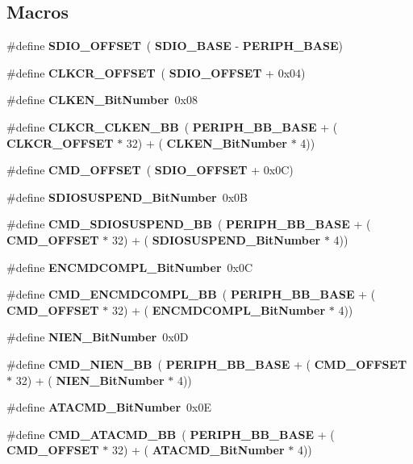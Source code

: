 \subsection*{Macros}
\begin{DoxyCompactItemize}
\item 
\#define \textbf{ S\+D\+I\+O\+\_\+\+O\+F\+F\+S\+ET}~(\textbf{ S\+D\+I\+O\+\_\+\+B\+A\+SE} -\/ \textbf{ P\+E\+R\+I\+P\+H\+\_\+\+B\+A\+SE})
\item 
\#define \textbf{ C\+L\+K\+C\+R\+\_\+\+O\+F\+F\+S\+ET}~(\textbf{ S\+D\+I\+O\+\_\+\+O\+F\+F\+S\+ET} + 0x04)
\item 
\#define \textbf{ C\+L\+K\+E\+N\+\_\+\+Bit\+Number}~0x08
\item 
\#define \textbf{ C\+L\+K\+C\+R\+\_\+\+C\+L\+K\+E\+N\+\_\+\+BB}~(\textbf{ P\+E\+R\+I\+P\+H\+\_\+\+B\+B\+\_\+\+B\+A\+SE} + (\textbf{ C\+L\+K\+C\+R\+\_\+\+O\+F\+F\+S\+ET} $\ast$ 32) + (\textbf{ C\+L\+K\+E\+N\+\_\+\+Bit\+Number} $\ast$ 4))
\item 
\#define \textbf{ C\+M\+D\+\_\+\+O\+F\+F\+S\+ET}~(\textbf{ S\+D\+I\+O\+\_\+\+O\+F\+F\+S\+ET} + 0x0\+C)
\item 
\#define \textbf{ S\+D\+I\+O\+S\+U\+S\+P\+E\+N\+D\+\_\+\+Bit\+Number}~0x0B
\item 
\#define \textbf{ C\+M\+D\+\_\+\+S\+D\+I\+O\+S\+U\+S\+P\+E\+N\+D\+\_\+\+BB}~(\textbf{ P\+E\+R\+I\+P\+H\+\_\+\+B\+B\+\_\+\+B\+A\+SE} + (\textbf{ C\+M\+D\+\_\+\+O\+F\+F\+S\+ET} $\ast$ 32) + (\textbf{ S\+D\+I\+O\+S\+U\+S\+P\+E\+N\+D\+\_\+\+Bit\+Number} $\ast$ 4))
\item 
\#define \textbf{ E\+N\+C\+M\+D\+C\+O\+M\+P\+L\+\_\+\+Bit\+Number}~0x0C
\item 
\#define \textbf{ C\+M\+D\+\_\+\+E\+N\+C\+M\+D\+C\+O\+M\+P\+L\+\_\+\+BB}~(\textbf{ P\+E\+R\+I\+P\+H\+\_\+\+B\+B\+\_\+\+B\+A\+SE} + (\textbf{ C\+M\+D\+\_\+\+O\+F\+F\+S\+ET} $\ast$ 32) + (\textbf{ E\+N\+C\+M\+D\+C\+O\+M\+P\+L\+\_\+\+Bit\+Number} $\ast$ 4))
\item 
\#define \textbf{ N\+I\+E\+N\+\_\+\+Bit\+Number}~0x0D
\item 
\#define \textbf{ C\+M\+D\+\_\+\+N\+I\+E\+N\+\_\+\+BB}~(\textbf{ P\+E\+R\+I\+P\+H\+\_\+\+B\+B\+\_\+\+B\+A\+SE} + (\textbf{ C\+M\+D\+\_\+\+O\+F\+F\+S\+ET} $\ast$ 32) + (\textbf{ N\+I\+E\+N\+\_\+\+Bit\+Number} $\ast$ 4))
\item 
\#define \textbf{ A\+T\+A\+C\+M\+D\+\_\+\+Bit\+Number}~0x0E
\item 
\#define \textbf{ C\+M\+D\+\_\+\+A\+T\+A\+C\+M\+D\+\_\+\+BB}~(\textbf{ P\+E\+R\+I\+P\+H\+\_\+\+B\+B\+\_\+\+B\+A\+SE} + (\textbf{ C\+M\+D\+\_\+\+O\+F\+F\+S\+ET} $\ast$ 32) + (\textbf{ A\+T\+A\+C\+M\+D\+\_\+\+Bit\+Number} $\ast$ 4))

\end{DoxyCompactItemize}
